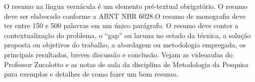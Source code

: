 \begin{resumo}
    O resumo na língua vernácula é um elemento pré-textual obrigatório. O resumo deve ser elaborado conforme a ABNT NBR 6028.O resumo de monografia deve ter entre 150 e 500 palavras em um único parágrafo. O resumo deve conter a contextualização do problema, o “gap” ou lacuna no estado da técnica, a solução proposta ou objetivos do trabalho, a abordagem ou metodologia empregada, os principais resultados, breves discussão e conclusão. Vejam as videoaulas do Professor Zucolotto \cite{Zucolotto} e as notas de aula da disciplina de Metodologia da Pesquisa para exemplos e detalhes de como fazer um bom resumo.
    
\end{resumo}